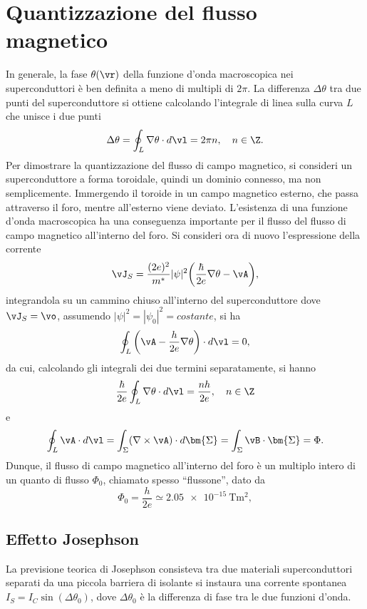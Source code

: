 \section{Quantizzazione del flusso magnetico}
In generale, la fase $\theta(\vr)$ della funzione d'onda macroscopica nei superconduttori è ben definita a meno di multipli di $2\pi$. La differenza $\Delta\theta$ tra due punti del superconduttore si ottiene calcolando l'integrale di linea sulla curva $L$ che unisce i due punti 
\begin{equation}
    \Delta\theta = \oint_L\nabla\theta \cdot d\vl = 2\pi n,\quad n \in \Z.
\end{equation}
Per dimostrare la quantizzazione del flusso di campo magnetico, si consideri un superconduttore a forma toroidale, quindi un dominio connesso, ma non semplicemente. Immergendo il toroide in un campo magnetico esterno, che passa attraverso il foro, mentre all'esterno viene deviato. L'esistenza di una funzione d'onda macroscopica ha una conseguenza importante per il flusso del flusso di campo magnetico all'interno del foro. Si consideri ora di nuovo l'espressione della corrente
\begin{equation}
    \vJ_S = \frac{(2e)^2}{m^*}|\psi|^2\bigg(\frac{\hbar}{2e}\nabla\theta - \vA\bigg),
\end{equation}
integrandola su un cammino chiuso all'interno del superconduttore dove $\vJ_S = \vo$, assumendo $|\psi|^2 = |\psi_0|^2 = costante$, si ha
\begin{equation}
    \oint_L\bigg(\vA - \frac{h}{2e}\nabla\theta\bigg)\cdot d\vl = 0,
\end{equation}
da cui, calcolando gli integrali dei due termini separatamente, si hanno
\begin{equation}
    \frac{\hbar}{2e}\oint_L\nabla\theta\cdot d\vl = \dfrac{nh}{2e},\quad n \in \Z
\end{equation}
e
\begin{equation}
    \oint_L \vA \cdot d\vl = \int_\Sigma(\nabla \times \vA)\cdot d\bm{\Sigma} = \int_\Sigma\vB \cdot \bm{\Sigma} = \Phi.
\end{equation}
Dunque, il flusso di campo magnetico all'interno del foro è un multiplo intero di un quanto di flusso $\Phi_0$, chiamato spesso ``flussone'', dato da
\begin{equation}
    \Phi_0 = \frac{h}{2e} \simeq \SI{2.05e-15}{\tesla\meter\squared},
\end{equation}

\subsection{Effetto Josephson}
La previsione teorica di Josephson consisteva tra due materiali superconduttori separati da una piccola barriera di isolante si instaura una corrente spontanea $I_S = I_C\sin{(\Delta\theta_0)}$, dove $\Delta\theta_0$ è la differenza di fase tra le due funzioni d'onda.

